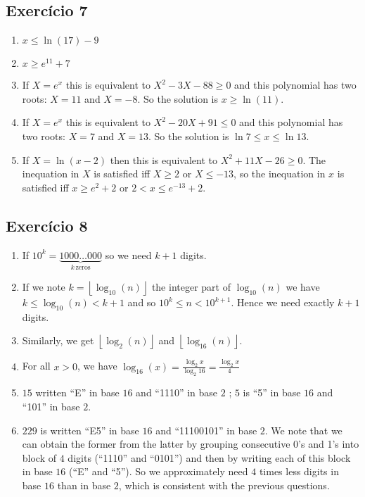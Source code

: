 \subsection*{Exercício 7}

\begin{enumerate}
\item $x \leq \ln{(17)} - 9$
\item $x \geq e^{11} + 7$
\item If $X = e^x$ this is equivalent to
  $X^2 -3X - 88 \geq 0$ and this polynomial has two roots: $X = 11$ and $X=-8$.
  So the solution is $x \geq \ln{(11)}$.
\item If $X = e^x$ this is equivalent to
  $X^2 -20X + 91 \leq 0$ and this polynomial has two roots: $X = 7$ and $X=13$.
  So the solution is $\ln{7} \leq x \leq \ln{13}$.
\item If $X = \ln{(x-2)}$ then this is equivalent to
  $X^2 +11X - 26 \geq 0$. The inequation in $X$ is satisfied iff
  $X \geq 2$ or $X \leq -13$, so the inequation in $x$ is satisfied iff
  $x \geq e^2 + 2$ or $2 < x \leq e^{-13} + 2$.
\end{enumerate}

\subsection*{Exercício 8}

\begin{enumerate}
\item If $10^k = \underset{k\,\text{zeros}}{\underbrace{1000\dots000}}$
  so we need $k+1$ digits.
\item If we note $k = \left\lfloor \log_{10}{(n)} \right\rfloor$
  the integer part of $\log_{10}{(n)}$ we have
  $k \leq \log_{10}{(n)} < k+1$ and so
  $10^k \leq n < 10^{k+1}$. Hence we need exactly $k+1$ digits.
\item Similarly, we get $\left\lfloor \log_2{(n)} \right\rfloor$ and
  $\left\lfloor \log_{16}{(n)} \right\rfloor$.
\item For all $x > 0$,
  we have $\log_{16}(x) = \frac{\log_2{x}}{\log_2{16}} = \frac{\log_2{x}}{4}$

\item $15$ written ``E'' in base $16$ and ``1110'' in base $2$ ;
  $5$ is ``5'' in base $16$ and ``101'' in base $2$.

\item $229$ is written ``E5'' in base $16$ and ``11100101'' in base $2$.
  We note that we can obtain the former from the latter by grouping
  consecutive 0's and 1's into block of $4$ digits
  (``1110'' and ``0101'') and then by writing each of this block in base $16$
  (``E'' and ``5''). So we approximately need $4$ times less digits in base
  $16$ than in base $2$, which is consistent with the previous questions.

\end{enumerate}

